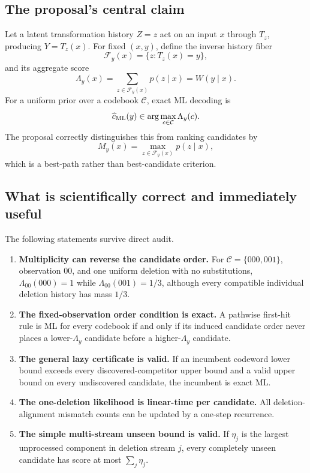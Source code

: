 \documentclass[11pt]{article}
\newcommand{\cC}{\mathcal C}
\begin{document}
\subsection{The proposal's central claim}
Let a latent transformation history $Z=z$ act on an input $x$ through $T_z$, producing $Y=T_z(x)$. For fixed $(x,y)$, define the inverse history fiber
\begin{equation}
\mathcal F_y(x)=\{z:T_z(x)=y\},
\end{equation}
and its aggregate score
\begin{equation}
\Lambda_y(x)=\sum_{z\in\mathcal F_y(x)}p(z\mid x)=W(y\mid x).
\label{eq:aggregate}
\end{equation}
For a uniform prior over a codebook $\cC$, exact ML decoding is
\begin{equation}
\widehat c_{\rm ML}(y)\in\arg\max_{c\in\cC}\Lambda_y(c).
\end{equation}
The proposal correctly distinguishes this from ranking candidates by
\begin{equation}
M_y(x)=\max_{z\in\mathcal F_y(x)}p(z\mid x),
\end{equation}
which is a best-path rather than best-candidate criterion.

\subsection{What is scientifically correct and immediately useful}
The following statements survive direct audit.
\begin{enumerate}[label=\textbf{C\arabic*.},leftmargin=2.2em]
\item \textbf{Multiplicity can reverse the candidate order.} For $\cC=\{000,001\}$, observation $00$, and one uniform deletion with no substitutions, $\Lambda_{00}(000)=1$ while $\Lambda_{00}(001)=1/3$, although every compatible individual deletion history has mass $1/3$.
\item \textbf{The fixed-observation order condition is exact.} A pathwise first-hit rule is ML for every codebook if and only if its induced candidate order never places a lower-$\Lambda_y$ candidate before a higher-$\Lambda_y$ candidate.
\item \textbf{The general lazy certificate is valid.} If an incumbent codeword lower bound exceeds every discovered-competitor upper bound and a valid upper bound on every undiscovered candidate, the incumbent is exact ML.
\item \textbf{The one-deletion likelihood is linear-time per candidate.} All deletion-alignment mismatch counts can be updated by a one-step recurrence.
\item \textbf{The simple multi-stream unseen bound is valid.} If $\eta_j$ is the largest unprocessed component in deletion stream $j$, every completely unseen candidate has score at most $\sum_j\eta_j$.
\end{enumerate}
\end{document}
